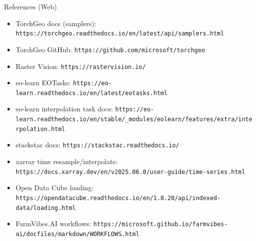\documentclass{beamer}
\begin{document}
\begin{frame}{References (Web)}
\footnotesize
\begin{itemize}
  \item TorchGeo docs (samplers): \texttt{https://torchgeo.readthedocs.io/en/latest/api/samplers.html}
  \item TorchGeo GitHub: \texttt{https://github.com/microsoft/torchgeo}
  \item Raster Vision: \texttt{https://rastervision.io/}
  \item eo-learn EOTasks: \texttt{https://eo-learn.readthedocs.io/en/latest/eotasks.html}
  \item eo-learn interpolation task docs: \texttt{https://eo-learn.readthedocs.io/en/stable/\_modules/eolearn/features/extra/interpolation.html}
  \item stackstac docs: \texttt{https://stackstac.readthedocs.io/}
  \item xarray time resample/interpolate: \texttt{https://docs.xarray.dev/en/v2025.06.0/user-guide/time-series.html}
  \item Open Data Cube loading: \texttt{https://opendatacube.readthedocs.io/en/1.8.20/api/indexed-data/loading.html}
  \item FarmVibes.AI workflows: \texttt{https://microsoft.github.io/farmvibes-ai/docfiles/markdown/WORKFLOWS.html}
\end{itemize}
\end{frame}
\end{document}
